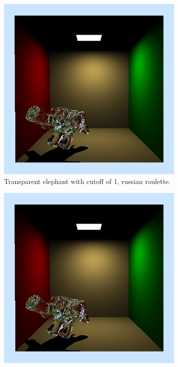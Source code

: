  \begin{figure}[h]
	\centering
	
	\begin{subfigure}[b]{0.3\textwidth}
		\includegraphics[width=\textwidth]{week3/elephant_1_russ.png}
		\caption{Transparent elephant with cutoff of 1, russian roulette.}
	\end{subfigure}
	\begin{subfigure}[b]{0.3\textwidth}
		\includegraphics[width=\textwidth]{week3/elephant_2_russ.png}

\end{subfigure}
\end{figure}
